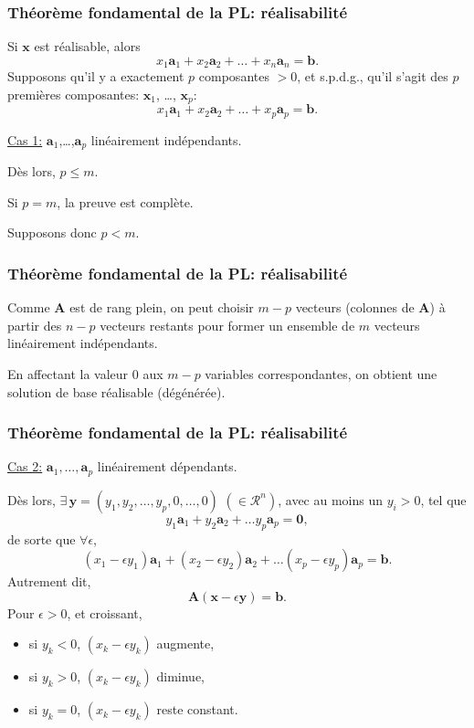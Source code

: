 \documentclass[usepdftitle=false]{beamer}
\def\ba{\boldsymbol{a}}
\def\bb{\boldsymbol{b}}
\def\bx{\boldsymbol{x}}
\def\by{\boldsymbol{y}}
\def\bA{\boldsymbol{A}}
\def\bzero{\boldsymbol{0}}
\begin{document}
\begin{frame}
\frametitle{Théorème fondamental de la PL: réalisabilité}

Si $\bx$ est réalisable, alors
\[
x_1 \ba_1 + x_2 \ba_2 + \ldots + x_n \ba_n = \bb.
\]
Supposons qu'il y a exactement $p$ composantes $> 0$, et s.p.d.g., qu'il s'agit des $p$ premières composantes: $\bx_1$, \ldots, $\bx_p$:
\[
x_1 \ba_1 + x_2 \ba_2 + \ldots + x_p \ba_p = \bb.
\]

\mbox{}

\underline{Cas 1:} $\ba_1$,\ldots,$\ba_p$ linéairement indépendants.

Dès lors, $p \leq m$.

Si $p = m$, la preuve est complète.

Supposons donc $p < m$.
\end{frame}

\begin{frame}
\frametitle{Théorème fondamental de la PL: réalisabilité}

Comme $\bA$ est de rang plein, on peut choisir $m-p$ vecteurs (colonnes de $\bA$) à partir des $n-p$ vecteurs restants pour former un ensemble de $m$ vecteurs linéairement indépendants.

\mbox{}

En affectant la valeur 0 aux $m-p$ variables correspondantes, on obtient une solution de base réalisable (dégénérée). 
\end{frame}

\begin{frame}
\frametitle{Théorème fondamental de la PL: réalisabilité}

\underline{Cas 2:} $\ba_1,\ldots,\ba_p$ linéairement dépendants.

Dès lors, $\exists\, \by = (y_1, y_2,\ldots, y_p,0,\ldots,0)$ $(\in \mathcal{R}^n)$, avec au moins un $y_i > 0$, tel que
$$
y_1 \ba_1 + y_2 \ba_2 + \ldots y_p \ba_p = \bzero,
$$
de sorte que $\forall \epsilon$,
$$
(x_1 - \epsilon y_1) \ba_1 + (x_2 - \epsilon y_2) \ba_2 + \ldots (x_p - \epsilon y_p) \ba_p = \bb.
$$
Autrement dit,
\[
\bA(\bx-\epsilon \by) = \bb.
\]
Pour $\epsilon > 0$, et croissant,
\begin{itemize}
\item 
si $y_k < 0$, $(x_k - \epsilon y_k)$ augmente,
\item 
si $y_k > 0$, $(x_k - \epsilon y_k)$ diminue,
\item 
si $y_k = 0$, $(x_k - \epsilon y_k)$ reste constant.
\end{itemize}
\end{frame}
\end{document}
